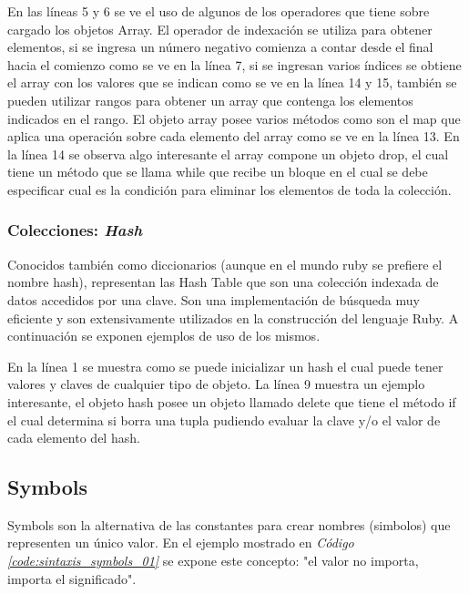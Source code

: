 \documentclass{article}
\newcommand{\refcode}[1]{\textit{Código \ref{#1}}}
\begin{document}
En las líneas 5 y 6 se ve el uso de algunos de los operadores que tiene sobre cargado los objetos Array.  El operador de indexación se utiliza para obtener elementos, si se ingresa un número negativo comienza a contar desde el final hacia el comienzo como se ve en la línea 7, si se ingresan varios índices se obtiene el array con los valores que se indican como se ve en la línea 14 y 15, también se pueden utilizar rangos para obtener un array que contenga los elementos indicados en el rango. El objeto array posee varios métodos como son el map que aplica una operación sobre cada elemento del array como se ve en la línea 13. En la línea 14 se observa algo interesante el array compone un objeto drop, el cual tiene un método que se llama while que recibe un bloque en el cual se debe especificar cual es la condición para eliminar los elementos de toda la colección.

\subsubsection{Colecciones: \textit{Hash}}
Conocidos también como diccionarios (aunque en el mundo ruby se prefiere el nombre hash), representan las Hash Table que son una colección indexada de datos accedidos por una clave. Son una implementación de búsqueda muy eficiente y son extensivamente utilizados en la construcción del lenguaje Ruby. A continuación se exponen ejemplos de uso de los mismos.

 
\bigskip

En la línea 1 se muestra como se puede inicializar un hash el cual puede tener valores y claves de cualquier tipo de objeto. La línea 9 muestra un ejemplo interesante, el  objeto hash posee un objeto llamado delete que tiene el método if el cual determina si borra una tupla pudiendo evaluar la clave y/o el valor de cada elemento del hash.

\subsection{Symbols}
Symbols son la alternativa de las constantes para crear nombres (simbolos) que representen un único valor.  En el ejemplo mostrado en  \refcode{code:sintaxis_symbols_01}  se expone este concepto: "el valor no importa, importa el significado".

 
\bigskip
\end{document}
